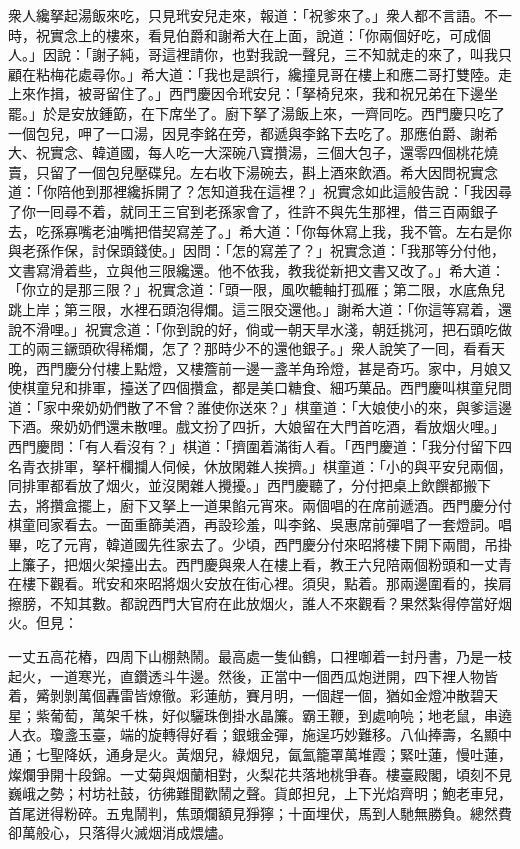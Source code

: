 衆人纔拏起湯飯來吃，只見玳安兒走來，報道：「祝爹來了。」{}衆人都不言語。{}不一時，祝實念上的樓來，看見伯爵和謝希大在上面，說道：「你兩個好吃，可成個人。」因說：「謝子純，哥這裡請你，也對我說一聲兒，三不知就走的來了，叫我只顧在粘梅花處尋你。」希大道：「我也是誤行，纔撞見哥在樓上和應二哥打雙陸。走上來作揖，被哥留住了。」西門慶因令玳安兒：「拏椅兒來，我和祝兄弟在下邊坐罷。」於是安放鍾筯，在下席坐了。廚下拏了湯飯上來，一齊同吃。西門慶只吃了一個包兒，呷了一口湯，因見李銘在旁，都遞與李銘下去吃了。那應伯爵、謝希大、祝實念、韓道國，每人吃一大深碗八寶攢湯，三個大包子，還零四個桃花燒賣，只留了一個包兒壓碟兒。左右收下湯碗去，斟上酒來飲酒。希大因問祝實念道：「你陪他到那裡纔拆開了？怎知道我在這裡？」祝實念如此這般告說：「我因尋了你一囘尋不着，就同王三官到老孫家會了，徃許不與先生{}那裡，借三百兩銀子去，吃孫寡嘴老油嘴把借契寫差了。」希大道：「你每休寫上我，我不管。左右是你與老孫作保，討保頭錢使。」因問：「怎的寫差了？」祝實念道：「我那等分付他，文書寫滑着些，立與他三限纔還。他不依我，教我從新把文書又改了。」希大道：「你立的是那三限？」祝實念道：「頭一限，風吹轆軸打孤雁；第二限，水底魚兒跳上岸；第三限，水裡石頭泡得爛。這三限交還他。」謝希大道：「你這等寫着，還說不滑哩。」祝實念道：「你到說的好，倘或一朝天旱水淺，朝廷挑河，把石頭吃做工的兩三鐝頭砍得稀爛，怎了？那時少不的還他銀子。」{}衆人說笑了一囘，看看天晚，西門慶分付樓上點燈，又樓簷前一邊一盞羊角玲燈，甚是奇巧。家中，月娘又使棋童兒和排軍，擡送了四個攢盒，都是美口糖食、細巧菓品。西門慶叫棋童兒問道：「家中衆奶奶們散了不曾？誰使你送來？」棋童道：「大娘使小的來，與爹這邊下酒。衆奶奶們還未散哩。戲文扮了四折，大娘留在大門首吃酒，看放烟火哩。」西門慶問：「有人看沒有？」棋道：「擠圍着滿街人看。「西門慶道：「我分付留下四名青衣排軍，拏杆欄攔人伺候，休放閑雜人挨擠。」棋童道：「小的與平安兒兩個，同排軍都看放了烟火，並沒閑雜人攪擾。」西門慶聽了，分付把桌上飲饌都搬下去，將攢盒擺上，廚下又拏上一道果餡元宵來。兩個唱的在席前遞酒。西門慶分付棋童囘家看去。一面重篩美酒，再設珍羞，叫李銘、吳惠席前彈唱了一套燈詞。唱畢，吃了元宵，韓道國先徃家去了。{}少頃，西門慶分付來昭將樓下開下兩間，吊掛上簾子，把烟火架擡出去。西門慶與衆人在樓上看，教王六兒陪兩個粉頭和一丈青在樓下觀看。玳安和來昭將烟火安放在街心裡。須臾，點着。那兩邊圍看的，挨肩擦膀，不知其數。都說西門大官府在此放烟火，誰人不來觀看？果然紮得停當好烟火。但見：

\begin{myquote}
一丈五高花樁，四周下山棚熱鬧。最高處一隻仙鶴，口裡啣着一封丹書，乃是一枝起火，一道寒光，直鑽透斗牛邊。然後，正當中一個西瓜炮迸開，四下裡人物皆着，觱剝剝萬個轟雷皆燎徹。彩蓮舫，賽月明，一個趕一個，猶如金燈冲散碧天星；紫葡萄，萬架千株，好似驪珠倒掛水晶簾。霸王鞭，到處响喨；地老鼠，串遶人衣。瓊盞玉臺，端的旋轉得好看；銀蛾金彈，施逞巧妙難移。八仙捧壽，名顯中通；七聖降妖，通身是火。黃烟兒，綠烟兒，氤氳籠罩萬堆霞；緊吐蓮，慢吐蓮，燦爛爭開十段錦。一丈菊與烟蘭相對，火梨花共落地桃爭春。樓臺殿閣，頃刻不見巍峨之勢；村坊社鼓，彷彿難聞歡鬧之聲。貨郎担兒，上下光焰齊明；鮑老車兒，首尾迸得粉碎。五鬼鬧判，焦頭爛額見猙獰；十面埋伏，馬到人馳無勝負。總然費卻萬般心，只落得火滅烟消成煨燼。
\end{myquote}

